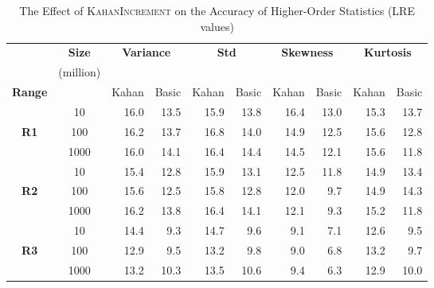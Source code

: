 \begin{table*}[thb]
\caption{The Effect of \textsc{KahanIncrement} on the Accuracy of Higher-Order Statistics (LRE values)}
\label{tab:univariate-vs-hive}
\centering
\begin{tabular}{|c|c|r|r|r|r|r|r|r|r|}
\hline
 & \textbf{Size} & \multicolumn{2}{|c|}{\textbf{Variance}} & \multicolumn{2}{|c|}{\textbf{Std}} & \multicolumn{2}{|c|}{\textbf{Skewness}} & \multicolumn{2}{|c|}{\textbf{Kurtosis}}\\
 & (million) & \multicolumn{2}{|c|}{} & \multicolumn{2}{|c|}{} & \multicolumn{2}{|c|}{} & \multicolumn{2}{|c|}{}\\
\hline
\textbf{Range} & & Kahan & Basic & Kahan & Basic & Kahan & Basic & Kahan & Basic\\ 
\hline
             & 10   & 16.0 & 13.5 & 15.9 & 13.8 & 16.4 & 13.0 & 15.3 & 13.7 \\
\textbf{R1}  & 100  & 16.2 & 13.7 & 16.8 & 14.0 & 14.9 & 12.5 & 15.6 & 12.8 \\
             & 1000 & 16.0 & 14.1 & 16.4 & 14.4 & 14.5 & 12.1 & 15.6 & 11.8\\
\hline
\hline
             & 10   & 15.4 & 12.8  & 15.9 & 13.1  & 12.5 & 11.8  & 14.9 & 13.4 \\
\textbf{R2}  & 100  & 15.6 & 12.5  & 15.8 & 12.8  & 12.0 & 9.7   & 14.9 & 14.3 \\
             & 1000 & 16.2 & 13.8  & 16.4 & 14.1  & 12.1 & 9.3   & 15.2 & 11.8 \\
\hline
\hline
             & 10   & 14.4 & 9.3    & 14.7 & 9.6  & 9.1  & 7.1   & 12.6  & 9.5 \\
\textbf{R3}  & 100  & 12.9 & 9.5    & 13.2 & 9.8  & 9.0  & 6.8  & 13.2  & 9.7 \\
             & 1000 & 13.2 & 10.3   & 13.5 & 10.6 & 9.4  & 6.3  & 12.9 & 10.0 \\
\hline
\end{tabular}
\end{table*}



